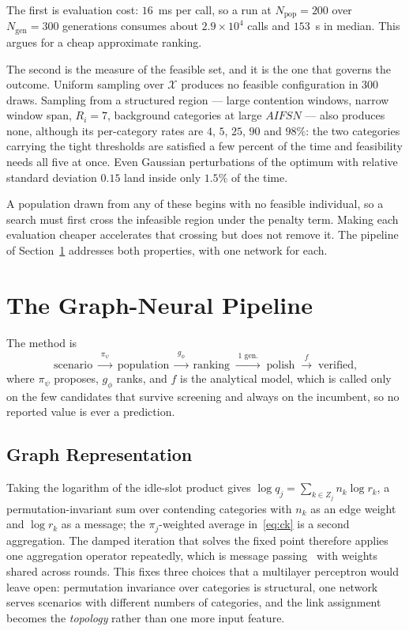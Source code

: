 \documentclass[journal,a4paper,comsoc,twocolumn]{IEEEtran}
\newcommand{\Npop}{N_{\mathrm{pop}}}
\newcommand{\Ngen}{N_{\mathrm{gen}}}
\begin{document}
The first is evaluation cost: $16$~ms per call, so a run at $\Npop = 200$ over
$\Ngen = 300$ generations consumes about $2.9\times10^{4}$ calls and $153$~s in
median. This argues for a cheap approximate ranking.

The second is the measure of the feasible set, and it is the one that governs
the outcome. Uniform sampling over $\mathcal{X}$ produces no feasible
configuration in $300$ draws. Sampling from a structured region --- large
contention windows, narrow window span, $R_i = 7$, background categories at
large $AIFSN$ --- also produces none, although its per-category rates are $4$,
$5$, $25$, $90$ and $98\%$: the two categories carrying the tight thresholds are
satisfied a few percent of the time and feasibility needs all five at once. Even
Gaussian perturbations of the optimum with relative standard deviation $0.15$
land inside only $1.5\%$ of the time.

A population drawn from any of these begins with no feasible individual, so a
search must first cross the infeasible region under the penalty term. Making
each evaluation cheaper accelerates that crossing but does not remove it. The
pipeline of Section~\ref{sec:pipe} addresses both properties, with one network
for each.

\section{The Graph-Neural Pipeline}
\label{sec:pipe}

The method is
\begin{equation}
\label{eq:pipeline}
\text{scenario}
\;\xrightarrow{\;\pi_\psi\;}\; \text{population}
\;\xrightarrow{\;g_\phi\;}\; \text{ranking}
\;\xrightarrow{\;\text{1 gen.}\;}\; \text{polish}
\;\xrightarrow{\;f\;}\; \text{verified,}
\end{equation}
where $\pi_\psi$ proposes, $g_\phi$ ranks, and $f$ is the analytical model,
which is called only on the few candidates that survive screening and always on
the incumbent, so no reported value is ever a prediction.

\subsection{Graph Representation}

Taking the logarithm of the idle-slot product gives
$\log q_j = \sum_{k \in Z_j} n_k \log r_k$, a permutation-invariant sum over
contending categories with $n_k$ as an edge weight and $\log r_k$ as a message;
the $\pi_j$-weighted average in~\eqref{eq:ck} is a second aggregation. The
damped iteration that solves the fixed point therefore applies one aggregation
operator repeatedly, which is message passing~\cite{Gilmer2017} with weights
shared across rounds. This fixes three choices that a multilayer perceptron
would leave open: permutation invariance over categories is structural, one
network serves scenarios with different numbers of categories, and the link
assignment becomes the \emph{topology} rather than one more input feature.
\end{document}
